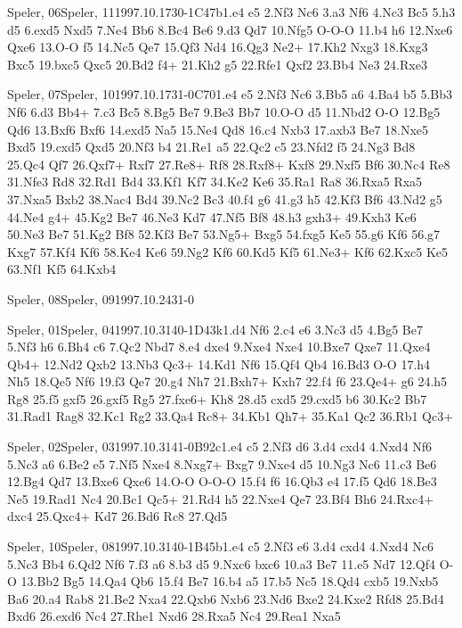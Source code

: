 \documentclass[twocolumn,a4paper,10pt]{report}
\begin{document}
\begin{chessgame}{Speler, 06}{Speler, 11}{1997.10.17}{3}{0-1}{C47b}{1.e4 e5 2.Nf3 Nc6 3.a3 Nf6 4.Nc3 Bc5 5.h3 d5 6.exd5 Nxd5 7.Ne4 Bb6 8.Bc4 Be6 9.d3 Qd7 10.Nfg5 O-O-O 11.b4 h6 12.Nxe6 Qxe6 13.O-O f5 14.Nc5 Qe7 15.Qf3 Nd4 16.Qg3 Ne2+ 17.Kh2 Nxg3 18.Kxg3 Bxc5 19.bxc5 Qxc5 20.Bd2 f4+ 21.Kh2 g5 22.Rfe1 Qxf2 23.Bb4 Ne3 24.Rxe3}\end{chessgame}
\begin{chessgame}{Speler, 07}{Speler, 10}{1997.10.17}{3}{1-0}{C70}{1.e4 e5 2.Nf3 Nc6 3.Bb5 a6 4.Ba4 b5 5.Bb3 Nf6 6.d3 Bb4+ 7.c3 Bc5 8.Bg5 Be7 9.Be3 Bb7 10.O-O d5 11.Nbd2 O-O 12.Bg5 Qd6 13.Bxf6 Bxf6 14.exd5 Na5 15.Ne4 Qd8 16.c4 Nxb3 17.axb3 Be7 18.Nxe5 Bxd5 19.cxd5 Qxd5 20.Nf3 b4 21.Re1 a5 22.Qc2 c5 23.Nfd2 f5 24.Ng3 Bd8 25.Qc4 Qf7 26.Qxf7+ Rxf7 27.Re8+ Rf8 28.Rxf8+ Kxf8 29.Nxf5 Bf6 30.Nc4 Re8 31.Nfe3 Rd8 32.Rd1 Bd4 33.Kf1 Kf7 34.Ke2 Ke6 35.Ra1 Ra8 36.Rxa5 Rxa5 37.Nxa5 Bxb2 38.Nac4 Bd4 39.Nc2 Bc3 40.f4 g6 41.g3 h5 42.Kf3 Bf6 43.Nd2 g5 44.Ne4 g4+ 45.Kg2 Be7 46.Ne3 Kd7 47.Nf5 Bf8 48.h3 gxh3+ 49.Kxh3 Ke6 50.Ne3 Be7 51.Kg2 Bf8 52.Kf3 Be7 53.Ng5+ Bxg5 54.fxg5 Ke5 55.g6 Kf6 56.g7 Kxg7 57.Kf4 Kf6 58.Ke4 Ke6 59.Ng2 Kf6 60.Kd5 Kf5 61.Ne3+ Kf6 62.Kxc5 Ke5 63.Nf1 Kf5 64.Kxb4}\end{chessgame}
\begin{chessempty}{Speler, 08}{Speler, 09}{1997.10.24}{3}{1-0}{}\end{chessempty}
\begin{chessgame}{Speler, 01}{Speler, 04}{1997.10.31}{4}{0-1}{D43k}{1.d4 Nf6 2.c4 e6 3.Nc3 d5 4.Bg5 Be7 5.Nf3 h6 6.Bh4 c6 7.Qc2 Nbd7 8.e4 dxe4 9.Nxe4 Nxe4 10.Bxe7 Qxe7 11.Qxe4 Qb4+ 12.Nd2 Qxb2 13.Nb3 Qc3+ 14.Kd1 Nf6 15.Qf4 Qb4 16.Bd3 O-O 17.h4 Nh5 18.Qe5 Nf6 19.f3 Qe7 20.g4 Nh7 21.Bxh7+ Kxh7 22.f4 f6 23.Qe4+ g6 24.h5 Rg8 25.f5 gxf5 26.gxf5 Rg5 27.fxe6+ Kh8 28.d5 cxd5 29.cxd5 b6 30.Kc2 Bb7 31.Rad1 Rag8 32.Kc1 Rg2 33.Qa4 Rc8+ 34.Kb1 Qh7+ 35.Ka1 Qc2 36.Rb1 Qc3+}\end{chessgame}
\begin{chessgame}{Speler, 02}{Speler, 03}{1997.10.31}{4}{1-0}{B92c}{1.e4 c5 2.Nf3 d6 3.d4 cxd4 4.Nxd4 Nf6 5.Nc3 a6 6.Be2 e5 7.Nf5 Nxe4 8.Nxg7+ Bxg7 9.Nxe4 d5 10.Ng3 Nc6 11.c3 Be6 12.Bg4 Qd7 13.Bxe6 Qxe6 14.O-O O-O-O 15.f4 f6 16.Qb3 e4 17.f5 Qd6 18.Be3 Ne5 19.Rad1 Nc4 20.Bc1 Qc5+ 21.Rd4 h5 22.Nxe4 Qe7 23.Bf4 Bh6 24.Rxc4+ dxc4 25.Qxc4+ Kd7 26.Bd6 Rc8 27.Qd5}\end{chessgame}
\begin{chessgame}{Speler, 10}{Speler, 08}{1997.10.31}{4}{0-1}{B45b}{1.e4 c5 2.Nf3 e6 3.d4 cxd4 4.Nxd4 Nc6 5.Nc3 Bb4 6.Qd2 Nf6 7.f3 a6 8.b3 d5 9.Nxc6 bxc6 10.a3 Be7 11.e5 Nd7 12.Qf4 O-O 13.Bb2 Bg5 14.Qa4 Qb6 15.f4 Be7 16.b4 a5 17.b5 Nc5 18.Qd4 cxb5 19.Nxb5 Ba6 20.a4 Rab8 21.Be2 Nxa4 22.Qxb6 Nxb6 23.Nd6 Bxe2 24.Kxe2 Rfd8 25.Bd4 Bxd6 26.exd6 Nc4 27.Rhe1 Nxd6 28.Rxa5 Nc4 29.Rea1 Nxa5}\end{chessgame}
\end{document}
